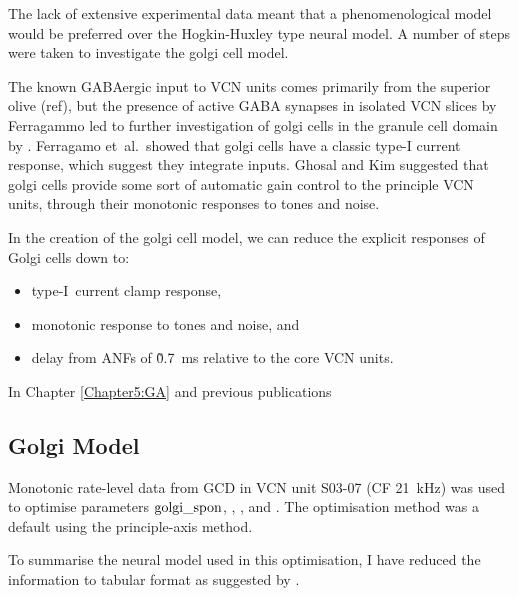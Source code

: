 \documentclass{article}
\begin{document}
The lack of extensive experimental data meant that a phenomenological model
would be preferred over the Hogkin-Huxley type neural model. A number of steps
were taken to investigate the golgi cell model.

The known GABAergic input to VCN units comes primarily from the superior olive
(ref), but the presence of active GABA synapses in isolated VCN slices by
Ferragammo \citet{FerragamoGoldingEtAl:1998a} led to further investigation of
golgi cells in the granule cell domain by \citet{FerragamoGoldingEtAl:1998a}.
Ferragamo et~al.~showed that golgi cells have a classic type-I current
response, which suggest they integrate inputs.  Ghosal and Kim
\citeyear{GhoshalKim:1997} suggested that golgi cells provide some sort of
automatic gain control to the principle VCN units, through their monotonic
responses to tones and noise.





   

In the creation of the golgi cell model, we can reduce the explicit
responses of Golgi cells down to:
\begin{itemize}
\item type-I~current clamp response,
\item monotonic response to tones and noise, and
\item delay from ANFs of \~0.7~ms relative to the core VCN units.
\end{itemize}


In Chapter \ref{Chapter5:GA} and previous publications \citep{EagerGraydenEtAl:2006a}


\subsection{Golgi Model}

Monotonic rate-level data from GCD in VCN \citep{GhoshalKim:1996} unit S03-07
(CF 21~kHz) was used to optimise parameters ${\rm golgi\_spon}$, \wLSRGLG,
\wHSRGLG, and  \sANFGLG.  The optimisation method was a default  using the principle-axis method.


To summarise the neural model used in this optimisation, I have
reduced the information to tabular format as suggested by
\citet{NordlieGewaltigEtAl:2009}.
\end{document}
